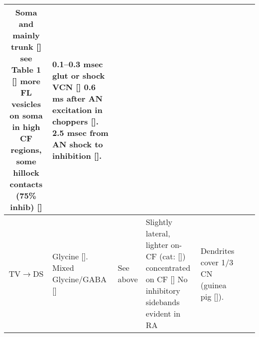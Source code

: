\begin{longtable}{cYYYYYY}
Soma and mainly trunk [] 
see Table 1 [] 
more FL vesicles on soma in high CF regions, some hillock contacts (75\% inhib) []
                                & %
0.1--0.3 msec glut or shock VCN []
0.6 ms after AN excitation in choppers []. 
2.5 msec from AN shock to inhibition []. 
\\ \midrule
TV\ensuremath{\rightarrow}DS                        
                                & %
Glycine []. 
Mixed  Glycine/GABA []                 
                                & %
See above
                                & %
Slightly lateral, lighter on-CF (cat: [])
concentrated on CF [] 
No inhibitory sidebands evident in RA                                   
                                & %
Dendrites cover 1/3 CN (guinea pig []).
                                & 



                      

\end{longtable}
